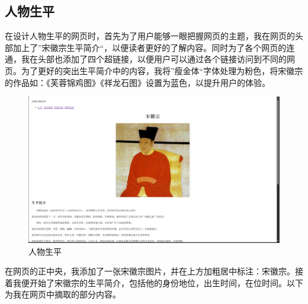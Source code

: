 \documentclass[supercite]{Experimental_Report}
\theoremstyle{definition}
\begin{document}
\subsection{人物生平}
在设计人物生平的网页时，首先为了用户能够一眼把握网页的主题，我在网页的头部加上了”宋徽宗生平简介“，以便读者更好的了解内容。同时为了各个网页的连通，我在头部也添加了四个超链接，以便用户可以通过各个链接访问到不同的网页。为了更好的突出生平简介中的内容，我将”瘦金体“字体处理为粉色，将宋徽宗的作品如：《芙蓉锦鸡图》《祥龙石图》设置为蓝色，以提升用户的体验。
\begin{figure}[H]
    \centering
    \includegraphics[width=1\linewidth]{./images/人物生平.png}
    \caption{人物生平}
    \label{fig:enter-label}
\end{figure}
\par 在网页的正中央，我添加了一张宋徽宗图片，并在上方加粗居中标注：宋徽宗。接着我便开始了宋徽宗的生平简介，包括他的身份地位，出生时间，在位时间。以下为我在网页中摘取的部分内容。
\end{document}
